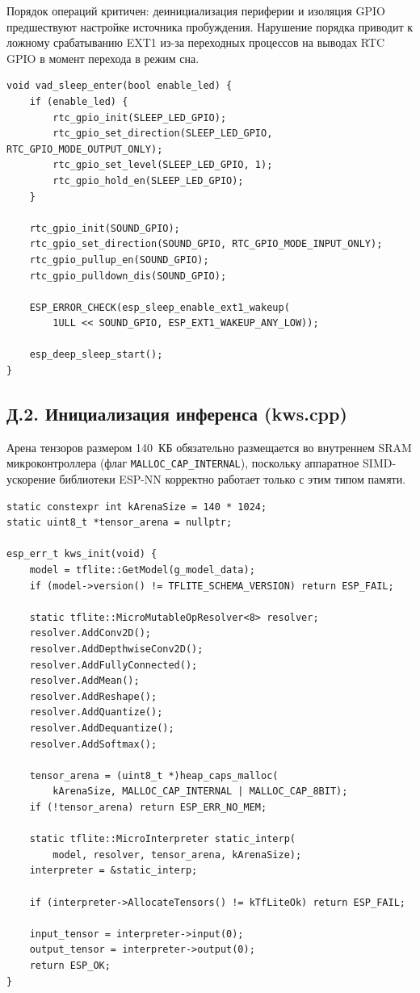 Порядок операций критичен: деинициализация периферии и изоляция
GPIO предшествуют настройке источника пробуждения. Нарушение
порядка приводит к ложному срабатыванию EXT1 из-за переходных
процессов на выводах RTC GPIO в момент перехода в режим сна.

\begin{verbatim}
void vad_sleep_enter(bool enable_led) {
    if (enable_led) {
        rtc_gpio_init(SLEEP_LED_GPIO);
        rtc_gpio_set_direction(SLEEP_LED_GPIO, RTC_GPIO_MODE_OUTPUT_ONLY);
        rtc_gpio_set_level(SLEEP_LED_GPIO, 1);
        rtc_gpio_hold_en(SLEEP_LED_GPIO);
    }

    rtc_gpio_init(SOUND_GPIO);
    rtc_gpio_set_direction(SOUND_GPIO, RTC_GPIO_MODE_INPUT_ONLY);
    rtc_gpio_pullup_en(SOUND_GPIO);
    rtc_gpio_pulldown_dis(SOUND_GPIO);

    ESP_ERROR_CHECK(esp_sleep_enable_ext1_wakeup(
        1ULL << SOUND_GPIO, ESP_EXT1_WAKEUP_ANY_LOW));

    esp_deep_sleep_start();
}
\end{verbatim}

\subsection*{Д.2. Инициализация инференса (kws.cpp)}

Арена тензоров размером 140~КБ обязательно размещается во
внутреннем SRAM микроконтроллера (флаг
\texttt{MALLOC\_CAP\_INTERNAL}), поскольку аппаратное
SIMD-ускорение библиотеки ESP-NN корректно работает только с
этим типом памяти.

\begin{verbatim}
static constexpr int kArenaSize = 140 * 1024;
static uint8_t *tensor_arena = nullptr;

esp_err_t kws_init(void) {
    model = tflite::GetModel(g_model_data);
    if (model->version() != TFLITE_SCHEMA_VERSION) return ESP_FAIL;

    static tflite::MicroMutableOpResolver<8> resolver;
    resolver.AddConv2D();
    resolver.AddDepthwiseConv2D();
    resolver.AddFullyConnected();
    resolver.AddMean();
    resolver.AddReshape();
    resolver.AddQuantize();
    resolver.AddDequantize();
    resolver.AddSoftmax();

    tensor_arena = (uint8_t *)heap_caps_malloc(
        kArenaSize, MALLOC_CAP_INTERNAL | MALLOC_CAP_8BIT);
    if (!tensor_arena) return ESP_ERR_NO_MEM;

    static tflite::MicroInterpreter static_interp(
        model, resolver, tensor_arena, kArenaSize);
    interpreter = &static_interp;

    if (interpreter->AllocateTensors() != kTfLiteOk) return ESP_FAIL;

    input_tensor = interpreter->input(0);
    output_tensor = interpreter->output(0);
    return ESP_OK;
}
\end{verbatim}

